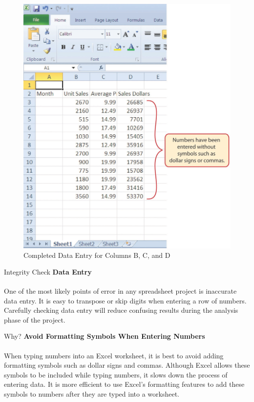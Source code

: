 \begin{figure}[H]
	\centering
	\includegraphics[width=\maxwidth{.95\linewidth}]{gfx/ch01_fig16}
	\caption{Completed Data Entry for Columns B, C, and D}
	\label{01:fig16}
\end{figure}

\begin{center}
	\begin{infobox}{Integrity Check}
		\textbf{Data Entry}
		\\
		\\
		One of the most likely points of error in any spreadsheet project is inaccurate data entry. It is easy to transpose or skip digits when entering a row of numbers. Carefully checking data entry will reduce confusing results during the analysis phase of the project.
	\end{infobox}
\end{center}

\begin{center}
	\begin{infobox}{Why?}
		\textbf{Avoid Formatting Symbols When Entering Numbers}
		\\
		\\
		When typing numbers into an Excel worksheet, it is best to avoid adding formatting symbols such as dollar signs and commas. Although Excel allows these symbols to be included while typing numbers, it slows down the process of entering data. It is more efficient to use Excel's formatting features to add these symbols to numbers after they are typed into a worksheet.
	\end{infobox}
\end{center}

